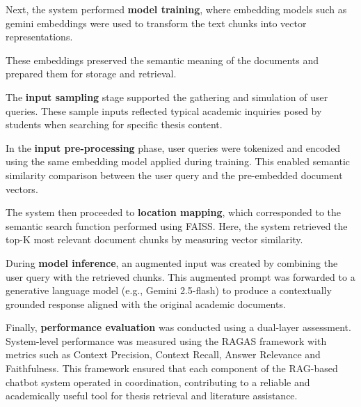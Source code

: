 \begin{refsection}
Next, the system performed \textbf{model training}, where embedding models such as gemini embeddings were used to transform the text chunks into vector representations.


These embeddings preserved the semantic meaning of the documents and prepared them for storage and retrieval.

The \textbf{input sampling} stage supported the gathering and simulation of user queries. These sample inputs reflected typical academic inquiries posed by students when searching for specific thesis content.

In the \textbf{input pre-processing} phase, user queries were tokenized and encoded using the same embedding model applied during training. This enabled semantic similarity comparison between the user query and the pre-embedded document vectors.

The system then proceeded to \textbf{location mapping}, which corresponded to the semantic search function performed using FAISS. Here, the system retrieved the top-K most relevant document chunks by measuring vector similarity.

During \textbf{model inference}, an augmented input was created by combining the user query with the retrieved chunks. This augmented prompt was forwarded to a generative language model (e.g., Gemini 2.5-flash) to produce a contextually grounded response aligned with the original academic documents.

Finally, \textbf{performance evaluation} was conducted using a dual-layer assessment. System-level performance was measured using the RAGAS framework with metrics such as Context Precision, Context Recall, Answer Relevance and Faithfulness. This framework ensured that each component of the RAG-based chatbot system operated in coordination, contributing to a reliable and academically useful tool for thesis retrieval and literature assistance.

\clearpage

\printbibliography[heading=subbibintoc, title={\centering Notes}]
\end{refsection}
